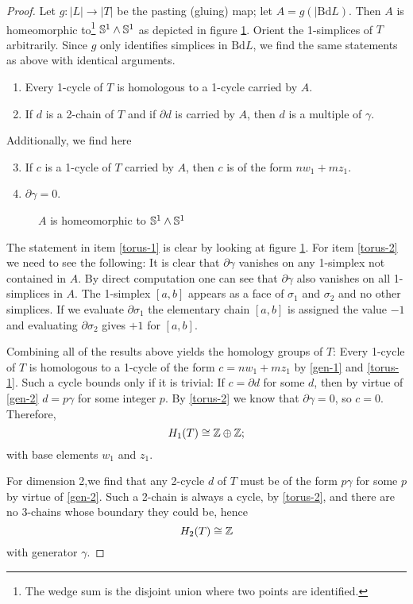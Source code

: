\begin{proof}
	Let $g: |L|\to |T|$ be the pasting (gluing) map; let $A=g(|\mathrm{Bd} L)$. Then $A$ is homeomorphic to\footnote{The wedge sum is the disjoint union where two points are identified.} $\mathbb{S}^1\wedge \mathbb{S}^1$ as depicted in figure \ref{wege-of-s1}. Orient the 1-simplices of $T$ arbitrarily. Since $g$ only identifies simplices in $\mathrm{Bd} L$, we find the same statements as above with identical arguments.
	\begin{enumerate}
		\item \label{gen-1}Every 1-cycle of $T$ is homologous to a 1-cycle carried by $A$.
		\item \label{gen-2}If $d$ is a 2-chain of $T$ and if $\partial d$ is carried by $A$, then $d$ is a multiple of $\gamma$.
	\end{enumerate}
	Additionally, we find here
	\begin{enumerate}\setcounter{enumi}{2}
		\item \label{torus-1} If $c$ is a 1-cycle of $T$ carried by $A$, then $c$ is of the form $nw_1+mz_1$.
		\item \label{torus-2}$\partial \gamma=0$.
	\end{enumerate} 
	\begin{figure}
		\begin{center}
			\caption{$A$ is homeomorphic to $\mathbb{S}^1\wedge \mathbb{S}^1$\label{wege-of-s1}}
		\end{center}
	\end{figure}

The statement in item \ref{torus-1} is clear by looking at figure \ref{wege-of-s1}. For item \ref{torus-2} we need to see the following: 
It is clear that $\partial\gamma$ vanishes on any 1-simplex not contained in $A$. By direct computation one can see that $\partial\gamma$ also vanishes on all 1-simplices in $A$. The 1-simplex $[a,b]$ appears as a face of $\sigma_1$ and $\sigma_2$ and no other simplices. If we evaluate $\partial\sigma_1$ the elementary chain $[a,b]$ is assigned the value $-1$ and evaluating $\partial\sigma_2$ gives $+1$ for $[a,b]$.

Combining all of the results above yields the homology groups of $T$:
Every 1-cycle of $T$ is homologous to a 1-cycle of the form $c=nw_1+mz_1$ by \ref{gen-1} and \ref{torus-1}. Such a cycle bounds only if it is trivial: If $c=\partial d$ for some $d$, then by virtue of \ref{gen-2} $d=p\gamma$ for some integer $p$. By \ref{torus-2} we know that $\partial\gamma=0$, so $c=0$. Therefore,
\[H_1(T)\cong\mathbb{Z}\oplus\mathbb{Z}; \]
with base elements $w_1$ and $z_1$.

For dimension 2,we find that any 2-cycle $d$ of $T$ must be of the form $p\gamma$ for some $p$ by virtue of \ref{gen-2}. Such a 2-chain is always a cycle, by \ref{torus-2}, and there are no 3-chains whose boundary they could be, hence
\[
H_2(T)\cong \mathbb{Z}
\]
with generator $\gamma$.
\end{proof}




